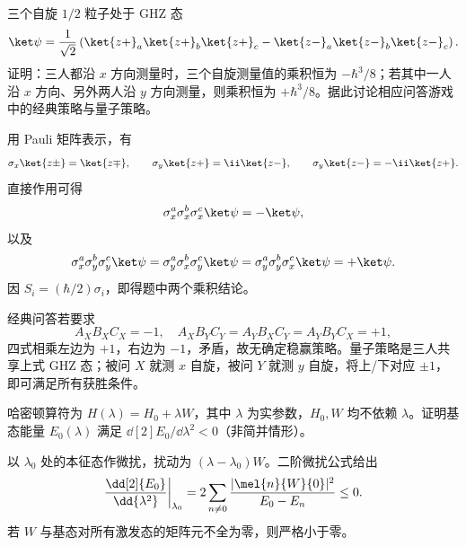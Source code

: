 \begin{question}
三个自旋 $1/2$ 粒子处于 GHZ 态
\[
  \ket\psi={1\over\sqrt2}\left(\ket{z+}_a\ket{z+}_b\ket{z+}_c-
  \ket{z-}_a\ket{z-}_b\ket{z-}_c\right).
\]
证明：三人都沿 $x$ 方向测量时，三个自旋测量值的乘积恒为 $-\hbar^3/8$；若其中一人沿 $x$ 方向、另外两人沿 $y$ 方向测量，则乘积恒为 $+\hbar^3/8$。据此讨论相应问答游戏中的经典策略与量子策略。
\begin{solution}
用 Pauli 矩阵表示，有
\[
  \sigma_x\ket{z\pm}=\ket{z\mp},
  \qquad \sigma_y\ket{z+}=\ii\ket{z-},
  \qquad \sigma_y\ket{z-}=-\ii\ket{z+}.
\]
直接作用可得
\[
  \sigma_x^a\sigma_x^b\sigma_x^c\ket\psi=-\ket\psi,
\]
以及
\[
  \sigma_x^a\sigma_y^b\sigma_y^c\ket\psi
  =\sigma_y^a\sigma_x^b\sigma_y^c\ket\psi
  =\sigma_y^a\sigma_y^b\sigma_x^c\ket\psi=+\ket\psi.
\]
因 $S_i=(\hbar/2)\sigma_i$，即得题中两个乘积结论。

经典问答若要求
\[
  A_XB_XC_X=-1,
  \quad A_XB_YC_Y=A_YB_XC_Y=A_YB_YC_X=+1,
\]
四式相乘左边为 $+1$，右边为 $-1$，矛盾，故无确定稳赢策略。量子策略是三人共享上式 GHZ 态；被问 $X$ 就测 $x$ 自旋，被问 $Y$ 就测 $y$ 自旋，将上/下对应 $\pm1$，即可满足所有获胜条件。
\end{solution}
\end{question}

\begin{question}
哈密顿算符为 $H(\lambda)=H_0+\lambda W$，其中 $\lambda$ 为实参数，$H_0,W$ 均不依赖 $\lambda$。证明基态能量 $E_0(\lambda)$ 满足 $\dd[2]{E_0}/\dd{\lambda^2}<0$（非简并情形）。
\begin{solution}
以 $\lambda_0$ 处的本征态作微扰，扰动为 $(\lambda-\lambda_0)W$。二阶微扰公式给出
\[
  {\dd[2]{E_0}\over\dd{\lambda^2}}\bigg|_{\lambda_0}
  =2\sum_{n\ne0}{|\mel{n}{W}{0}|^2\over E_0-E_n}\le0.
\]
若 $W$ 与基态对所有激发态的矩阵元不全为零，则严格小于零。
\end{solution}
\end{question}

